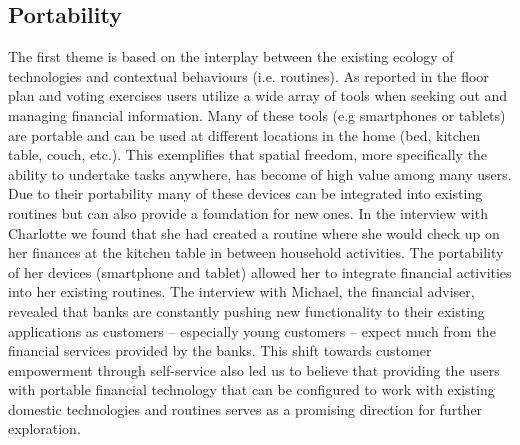 \subsection{Portability}
The first theme is based on the interplay between the existing ecology of technologies and contextual behaviours (i.e. routines). As reported in the floor plan and voting exercises users utilize a wide array of tools when seeking out and managing financial information. Many of these tools (e.g smartphones or tablets) are portable and can be used at different locations in the home (bed, kitchen table, couch, etc.). This exemplifies that spatial freedom, more specifically the ability to undertake tasks anywhere, has become of high value among many users. Due to their portability many of these devices can be integrated into existing routines but can also provide a foundation for new ones. In the interview with Charlotte we found that she had created a routine where she would check up on her finances at the kitchen table in between household activities. The portability of her devices (smartphone and tablet) allowed her to integrate financial activities into her existing routines. The interview with Michael, the financial adviser, revealed that banks are constantly pushing new functionality to their existing applications as customers -- especially young customers -- expect much from the financial services provided by the banks. This shift towards customer empowerment through self-service also led us to believe that providing the users with portable financial technology that can be configured to work with existing domestic technologies and routines serves as a promising direction for further exploration.

